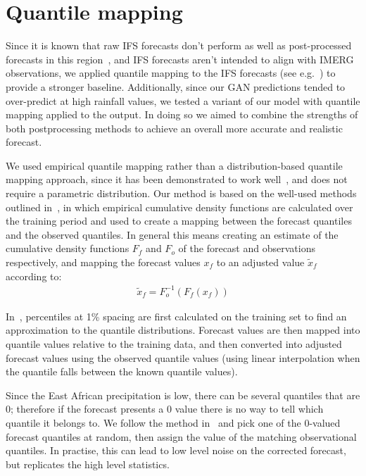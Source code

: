 \documentclass[../main.tex]{subfiles}
\begin{document}
\section{Quantile mapping}
\label{subsec:qm}
Since it is known that raw IFS forecasts don't perform as well as post-processed forecasts in this region~\citep{vogel_skill_2018}, and IFS forecasts aren't intended to align with IMERG observations, we applied quantile mapping to the IFS forecasts (see e.g.~\cite{maraun_model_2017}) to provide a stronger baseline. Additionally, since our GAN predictions tended to over-predict at high rainfall values, we tested a variant of our model with quantile mapping applied to the output. In doing so we aimed to combine the strengths of both postprocessing methods to achieve an overall more accurate and realistic forecast. 


We used empirical quantile mapping rather than a distribution-based quantile mapping approach, since it has been demonstrated to work well~\citep{gudmundsson_quantile_2012}, and does not require a parametric distribution. Our method is based on the well-used methods outlined in~\cite{boe_statistical_2007, deque_frequency_2007, maraun_model_2017}, in which empirical cumulative density functions are calculated over the training period and used to create a mapping between the forecast quantiles and the observed quantiles. In general this means creating an estimate of the cumulative density functions $F_{f}$ and $F_{o}$ of the forecast and observations respectively, and mapping the forecast values $x_{f}$ to an adjusted value $\tilde{x}_f$ according to:
\begin{align}
    \tilde{x}_f = F^{-1}_o (F_f (x_f))
\end{align}

In~\cite{boe_statistical_2007}, percentiles at 1\% spacing are first calculated on the training set to find an approximation to the quantile distributions. Forecast values are then mapped into quantile values relative to the training data, and then converted into adjusted forecast values using the observed quantile values (using linear interpolation when the quantile falls between the known quantile values). 

Since the East African precipitation is low, there can be several quantiles that are 0; therefore if the forecast presents a 0 value there is no way to tell which quantile it belongs to. We follow the method in~\cite{boe_statistical_2007} and pick one of the 0-valued forecast quantiles at random, then assign the value of the matching observational quantiles. In practise, this can lead to low level noise on the corrected forecast, but replicates the high level statistics.
\end{document}
